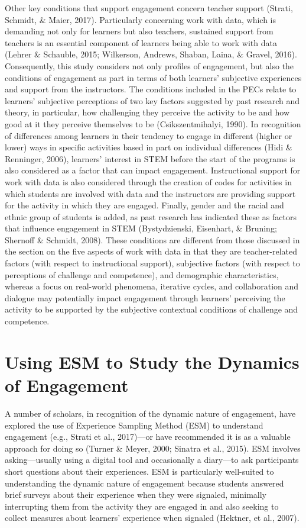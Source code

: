 \documentclass[]{msu-thesis}
\theoremstyle{definition}
\theoremstyle{definition}
\theoremstyle{definition}
\theoremstyle{remark}
\begin{document}
Other key conditions that support engagement concern teacher support
(Strati, Schmidt, \& Maier, 2017). Particularly concerning work with
data, which is demanding not only for learners but also teachers,
sustained support from teachers is an essential component of learners
being able to work with data (Lehrer \& Schauble, 2015; Wilkerson,
Andrews, Shaban, Laina, \& Gravel, 2016). Consequently, this study
considers not only profiles of engagement, but also the conditions of
engagement as part in terms of both learners' subjective experiences and
support from the instructors. The conditions included in the PECs relate
to learners' subjective perceptions of two key factors suggested by past
research and theory, in particular, how challenging they perceive the
activity to be and how good at it they perceive themselves to be
(Csikszentmihalyi, 1990). In recognition of differences among learners
in their tendency to engage in different (higher or lower) ways in
specific activities based in part on individual differences (Hidi \&
Renninger, 2006), learners' interest in STEM before the start of the
programs is also considered as a factor that can impact engagement.
Instructional support for work with data is also considered through the
creation of codes for activities in which students are involved with
data and the instructors are providing support for the activity in which
they are engaged. Finally, gender and the racial and ethnic group of
students is added, as past research has indicated these as factors that
influence engagement in STEM (Bystydzienski, Eisenhart, \& Bruning;
Shernoff \& Schmidt, 2008). These conditions are different from those
discussed in the section on the five aspects of work with data in that
they are teacher-related factors (with respect to instructional
support), subjective factors (with respect to perceptions of challenge
and competence), and demographic characteristics, whereas a focus on
real-world phenomena, iterative cycles, and collaboration and dialogue
may potentially impact engagement through learners' perceiving the
activity to be supported by the subjective contextual conditions of
challenge and competence.

\section{Using ESM to Study the Dynamics of
Engagement}\label{using-esm-to-study-the-dynamics-of-engagement}

A number of scholars, in recognition of the dynamic nature of
engagement, have explored the use of Experience Sampling Method (ESM) to
understand engagement (e.g., Strati et al., 2017)---or have recommended
it is as a valuable approach for doing so (Turner \& Meyer, 2000;
Sinatra et al., 2015). ESM involves asking---usually using a digital
tool and occasionally a diary---to ask participants short questions
about their experiences. ESM is particularly well-suited to
understanding the dynamic nature of engagement because students answered
brief surveys about their experience when they were signaled, minimally
interrupting them from the activity they are engaged in and also seeking
to collect measures about learners' experience when signaled (Hektner,
et al., 2007).
\end{document}
